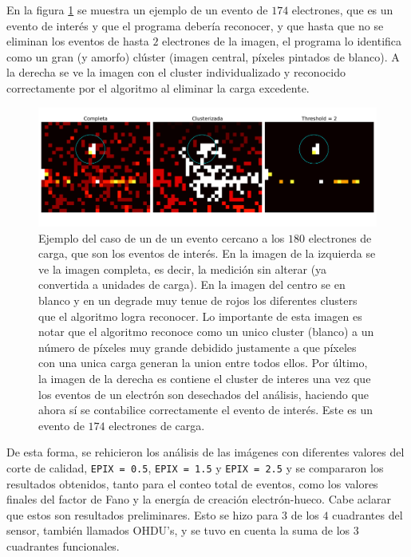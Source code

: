 \indent En la figura \ref{fig:ClusterPegoteado} se muestra un ejemplo de un evento de $174$ electrones, que es un evento de interés y que el programa debería reconocer, y que hasta que no se eliminan los eventos de hasta $2$ electrones de la imagen, el programa lo identifica como un gran (y amorfo) clúster (imagen central, píxeles pintados de blanco). A la derecha se ve la imagen con el cluster individualizado y reconocido correctamente por el algoritmo al eliminar la carga excedente.
\begin{figure}[H]
    \centering
    \includegraphics[scale=0.4]{Figs/despegoteo_clusters.pdf}
    \caption{\footnotesize{Ejemplo del caso de un de un evento cercano a los $180$ electrones de carga, que son los eventos de interés. En la imagen de la izquierda se ve la imagen completa, es decir, la medición sin alterar (ya convertida a unidades de carga). En la imagen del centro se en blanco y en un degrade muy tenue de rojos los diferentes clusters que el algoritmo logra reconocer. Lo importante de esta imagen es notar que el algoritmo reconoce como un unico cluster (blanco) a un número de píxeles muy grande debidido justamente a que píxeles con una unica carga generan la union entre todos ellos. Por último, la imagen de la derecha es contiene el cluster de interes una vez que los eventos de un electrón son desechados del análisis, haciendo que ahora sí se contabilice correctamente el evento de interés. Este es un evento de $174$ electrones de carga.}}
    \label{fig:ClusterPegoteado}
\end{figure}
De esta forma, se rehicieron los análisis de las imágenes con diferentes valores del corte de calidad, \verb|EPIX = 0.5|, \verb|EPIX = 1.5| y \verb|EPIX = 2.5| y se compararon los resultados obtenidos, tanto para el conteo total de eventos, como los valores finales del factor de Fano y la energía de creación electrón-hueco. Cabe aclarar que estos son resultados preliminares. Esto se hizo para $3$ de los $4$ cuadrantes del sensor, también llamados OHDU's, y se tuvo en cuenta la suma de los 3 cuadrantes funcionales.\\
